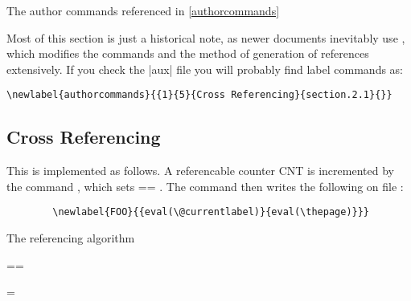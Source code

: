 The author commands referenced in \autoref{authorcommands}

Most of this section is just a historical note, as newer documents
inevitably use , which modifies the commands and the method
of generation of references extensively. If you check the |aux| file
you will probably find label commands as:

\begin{verbatim}
\newlabel{authorcommands}{{1}{5}{Cross Referencing}{section.2.1}{}}
\end{verbatim}

 \subsection{Cross Referencing}

    \begin{teX}
    \end{teX}

  This is implemented as follows.  A referencable counter  CNT  is
  incremented by the command   , which sets
   == .   The command
   then writes the following on file  :

\begin{verbatim}
        \newlabel{FOO}{{eval(\@currentlabel)}{eval(\thepage)}}}
\end{verbatim}

\LinesNumbered
\begin{algorithm}
\caption{The referencing algorithm}
   ==

   =
\end{algorithm}



